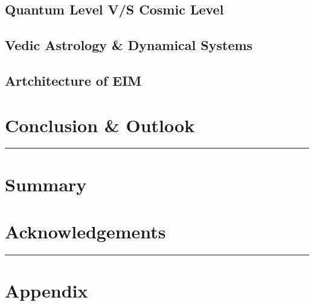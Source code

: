 \documentclass[12pt, a4paper]{article}
\begin{document}
\begin{multicols}{2}
		\subsection{Quantum Level V/S Cosmic Level}
		
		\subsection{Vedic Astrology \& Dynamical Systems}
		
		\subsection{Artchitecture of EIM}
		
		\section{Conclusion \& Outlook}
		
	\end{multicols}
	\hrule
	\centering
	\section*{Summary}
	
	\section*{Acknowledgements}
	
	\newline
	\hrule
	
	
	\appendix
	\section*{Appendix}
	
\end{document}
